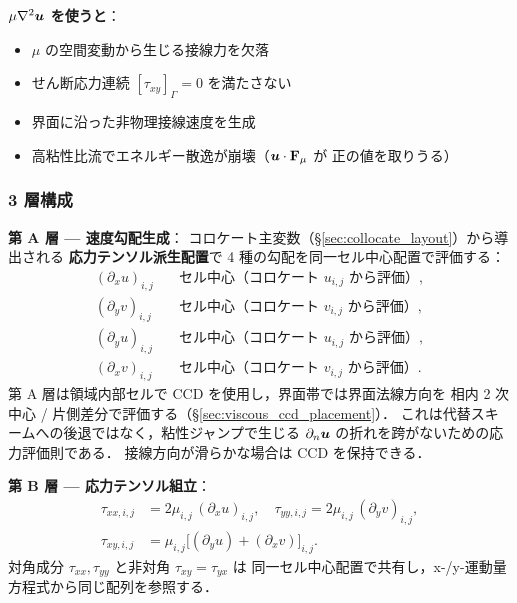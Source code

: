 \noindent\textbf{$\mu\nabla^2\bm{u}$ を使うと}：
\begin{itemize}
  \item $\mu$ の空間変動から生じる接線力を欠落
  \item せん断応力連続 $[\tau_{xy}]_\Gamma = 0$ を満たさない
  \item 界面に沿った非物理接線速度を生成
  \item 高粘性比流でエネルギー散逸が崩壊（$\bm{u}\cdot\mathbf{F}_\mu$ が
        正の値を取りうる）
\end{itemize}

\subsubsection{3 層構成}
\label{sec:viscous_three_layers}

\noindent\textbf{第 A 層 — 速度勾配生成}：
コロケート主変数（\S\ref{sec:collocate_layout}）から導出される
\textbf{応力テンソル派生配置}で
4 種の勾配を同一セル中心配置で評価する：
\begin{align}
  (\partial_x u)_{i,j} &\quad\text{セル中心（コロケート $u_{i,j}$ から評価）}, \label{eq:viscous_layerA_1}\\
  (\partial_y v)_{i,j} &\quad\text{セル中心（コロケート $v_{i,j}$ から評価）}, \label{eq:viscous_layerA_2}\\
  (\partial_y u)_{i,j} &\quad\text{セル中心（コロケート $u_{i,j}$ から評価）}, \label{eq:viscous_layerA_3}\\
  (\partial_x v)_{i,j} &\quad\text{セル中心（コロケート $v_{i,j}$ から評価）}. \label{eq:viscous_layerA_4}
\end{align}
第 A 層は領域内部セルで CCD を使用し，界面帯では界面法線方向を
相内 2 次中心 / 片側差分で評価する（\S\ref{sec:viscous_ccd_placement}）．
これは代替スキームへの後退ではなく，粘性ジャンプで生じる
$\partial_n\bm{u}$ の折れを跨がないための応力評価則である．
接線方向が滑らかな場合は CCD を保持できる．

\noindent\textbf{第 B 層 — 応力テンソル組立}：
\begin{align}
  \tau_{xx,i,j} &= 2\mu_{i,j}\,(\partial_x u)_{i,j}, \quad
  \tau_{yy,i,j} = 2\mu_{i,j}\,(\partial_y v)_{i,j}, \label{eq:viscous_layerB_diag}\\
  \tau_{xy,i,j} &= \mu_{i,j}\bigl[(\partial_y u) + (\partial_x v)\bigr]_{i,j}. \label{eq:viscous_layerB_off}
\end{align}
対角成分 $\tau_{xx},\tau_{yy}$ と非対角 $\tau_{xy}=\tau_{yx}$ は
同一セル中心配置で共有し，x-/y-運動量方程式から同じ配列を参照する．

